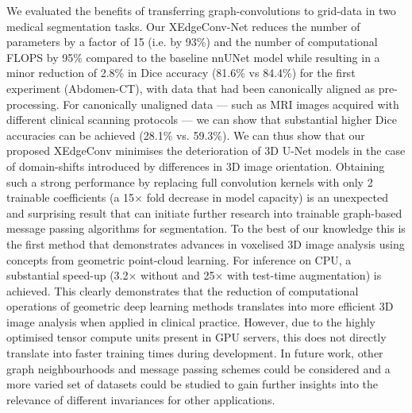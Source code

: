     We evaluated the benefits of transferring graph-convolutions to grid-data in two medical segmentation tasks. Our XEdgeConv-Net reduces the number of parameters by a factor of 15 (i.e. by 93\%) and the number of computational FLOPS by 95\% compared to the baseline nnUNet model while resulting in a minor reduction of 2.8\% in Dice accuracy (81.6\% vs 84.4\%) for the first experiment (Abdomen-CT), with data that had been canonically aligned as pre-processing. For canonically unaligned data --- such as MRI images acquired with different clinical scanning protocols --- we can show that substantial higher Dice accuracies can be achieved (28.1\% vs. 59.3\%). We can thus show that our proposed XEdgeConv minimises the deterioration of 3D U-Net models in the case of domain-shifts introduced by differences in 3D image orientation.
    Obtaining such a strong performance by replacing full convolution kernels with only 2 trainable coefficients (a 15$\times$ fold decrease in model capacity) is an unexpected and surprising result that can initiate further research into trainable graph-based message passing algorithms for segmentation.
    To the best of our knowledge this is the first method that demonstrates advances in voxelised 3D image analysis using concepts from geometric point-cloud learning.
    For inference on CPU, a substantial speed-up (3.2$\times$ without and 25$\times$ with test-time augmentation) is achieved.
    This clearly demonstrates that the reduction of computational operations of geometric deep learning methods translates into more efficient 3D image analysis when applied in clinical practice. However, due to the highly optimised tensor compute units present in GPU servers, this does not directly translate into faster training times during development.
    In future work, other graph neighbourhoods and message passing schemes could be considered and a more varied set of datasets could be studied to gain further insights into the relevance of different invariances for other applications.
